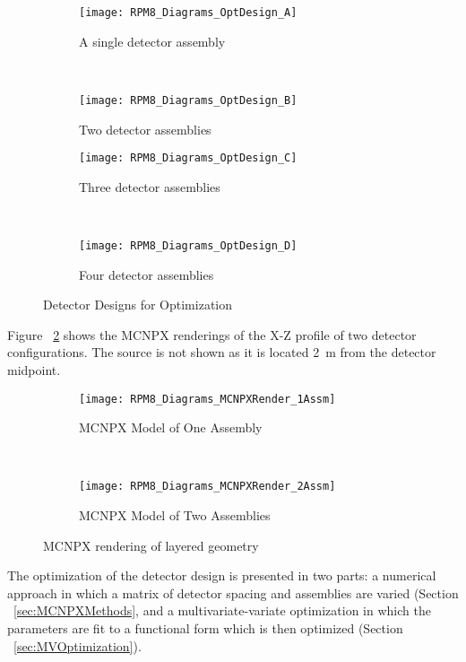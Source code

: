 \begin{figure}
    \centering
    \begin{subfigure}[b]{0.45\textwidth}
        \texttt{[image: RPM8\_Diagrams\_OptDesign\_A]}
        \caption{A single detector assembly}
    \end{subfigure}
    ~
    \begin{subfigure}[b]{0.45\textwidth}
        \texttt{[image: RPM8\_Diagrams\_OptDesign\_B]}
        \caption{Two detector assemblies}
    \end{subfigure}

    \begin{subfigure}[b]{0.45\textwidth}
        \texttt{[image: RPM8\_Diagrams\_OptDesign\_C]}
        \caption{Three detector assemblies}
    \end{subfigure}
    ~
    \begin{subfigure}[b]{0.45\textwidth}
        \texttt{[image: RPM8\_Diagrams\_OptDesign\_D]}
        \caption{Four detector assemblies}
    \end{subfigure}
    \caption{Detector Designs for Optimization}
    \label{fig:OptDesignSchematics}
\end{figure}

Figure ~\ref{fig:MCNPXRendering} shows the MCNPX renderings of the X-Z profile of two detector configurations.
The source is not shown as it is located \SI{2}{\meter} from the detector midpoint.

\begin{figure}
    \centering
    \begin{subfigure}[b]{0.45\textwidth}
        \texttt{[image: RPM8\_Diagrams\_MCNPXRender\_1Assm]}
        \caption{MCNPX Model of One Assembly}
    \end{subfigure}%
    ~
    \begin{subfigure}[b]{0.45\textwidth}
        \texttt{[image: RPM8\_Diagrams\_MCNPXRender\_2Assm]}
        \caption{MCNPX Model of Two Assemblies}
    \end{subfigure}
    \caption{MCNPX rendering of layered geometry}
    \label{fig:MCNPXRendering}
\end{figure}
The optimization of the detector design is presented in two parts: a numerical approach in which a matrix of detector spacing and assemblies are varied (Section ~\ref{sec:MCNPXMethods}, and a multivariate-variate optimization in which the parameters are fit to a functional form which is then optimized (Section ~\ref{sec:MVOptimization}).
